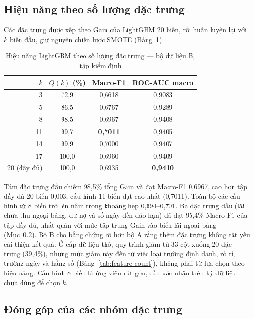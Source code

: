 \subsection{Hiệu năng theo số lượng đặc trưng}
\label{sec:res-b-topk}

Các đặc trưng được xếp theo Gain của LightGBM 20 biến, rồi huấn luyện lại với $k$ biến đầu, giữ nguyên chiến lược SMOTE (Bảng~\ref{tab:top-k-results}).

\begin{table}[H]
\centering
\caption{Hiệu năng LightGBM theo số lượng đặc trưng --- bộ dữ liệu B, tập kiểm định}
\label{tab:top-k-results}
\begin{tabular}{|r|c|c|c|}
\hline
$k$ & $Q(k)$ (\%) & Macro-F1 & ROC-AUC macro\\
\hline
3 & 72,9 & 0,6618 & 0,9083\\
5 & 86,5 & 0,6767 & 0,9289\\
8 & 98,5 & 0,6967 & 0,9408\\
11 & 99,7 & \textbf{0,7011} & 0,9405\\
14 & 99,9 & 0,7000 & 0,9407\\
17 & 100,0 & 0,6960 & 0,9409\\
20 (đầy đủ) & 100,0 & 0,6935 & \textbf{0,9410}\\
\hline
\end{tabular}
\end{table}

Tám đặc trưng đầu chiếm 98,5\% tổng Gain và đạt Macro-F1 0,6967, cao hơn tập đầy đủ 20 biến 0,003; cấu hình 11 biến đạt cao nhất (0,7011). Toàn bộ các cấu hình từ 8 biến trở lên nằm trong khoảng hẹp 0,694--0,701. Ba đặc trưng đầu (lãi chưa thu ngoại bảng, dư nợ và số ngày đến đáo hạn) đã đạt 95,4\% Macro-F1 của tập đầy đủ, nhất quán với mức tập trung Gain vào biến lãi ngoại bảng (Mục~\ref{sec:res-b-groups}). Bộ B cho bằng chứng rõ hơn bộ A rằng thêm đặc trưng không tất yếu cải thiện kết quả. Ở cấp dữ liệu thô, quy trình giảm từ 33 cột xuống 20 đặc trưng (39,4\%), nhưng mức giảm này đến từ việc loại trường định danh, rò rỉ, trường ngày và hằng số (Bảng~\ref{tab:feature-count}), không phải từ lựa chọn theo hiệu năng. Cấu hình 8 biến là ứng viên rút gọn, cần xác nhận trên kỳ dữ liệu chưa dùng để chọn $k$.

\subsection{Đóng góp của các nhóm đặc trưng}
\label{sec:res-b-groups}

